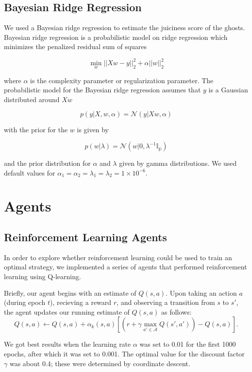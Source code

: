 \documentclass[11pt]{amsart}
\begin{document}
\subsection{Bayesian Ridge Regression}

We used a Bayesian ridge regression to estimate the juiciness score of the ghosts. Bayesian ridge regression is a probabilistic model on ridge regression which minimizes the penalized residual sum of squares

$$ \min_w ||Xw - y||_2^2 + \alpha||w||_2^2 $$

where $\alpha$ is the complexity parameter or regularization parameter. The probabilistic model for the Bayesian ridge regression assumes that $y$ is a Gaussian distributed around $Xw$

$$ p(y | X, w, \alpha) = \mathcal{N}(y  | Xw, \alpha) $$ 

with the prior for the $w$ is given by

$$ p(w | \lambda) = \mathcal{N}(w | 0, \lambda^{-1}\mathbb{I_p}) $$

and the prior distribution for $\alpha$ and $\lambda$ given by gamma distributions. We used default values for $\alpha_1 = \alpha_2 = \lambda_1 = \lambda_2 = 1 \times 10^{-6}$.


\section{Agents}

\subsection{Reinforcement Learning Agents}

In order to explore whether reinforcement learning could be used to train an optimal strategy, we implemented a series of agents that performed reinforcement learning using Q-learning.

Briefly, our agent begins with an estimate of $Q(s,a)$. Upon taking an action $a$ (during epoch $t$), recieving a reward $r$, and observing a transition from $s$
to $s'$, the agent updates our running estimate of $Q(s,a)$ as follows:
$$Q(s,a) \gets Q(s,a) + \alpha_k(s,a) \left[ (r + \gamma \max_{a' \in \mathcal{A}} Q(s', a')) - Q(s,a) \right].$$

We got best results when the learning rate $\alpha$ was set to 0.01 for the first 1000 epochs, after which it was set to 0.001. The optimal value for the discount factor $\gamma$ was about 0.4; these were determined by coordinate descent. 
\end{document}

